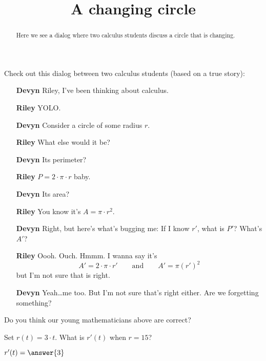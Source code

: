 \documentclass{ximera}
\title[Break-Ground:]{A changing circle}
\begin{document}
\begin{abstract}
Here we see a dialog where two calculus students discuss a circle that
is changing.
\end{abstract}
\maketitle

Check out this dialog between two calculus students (based on a true
story):

\begin{itemize}
  \item[\textbf{Devyn}] Riley, I've been thinking about calculus.   
  \item[\textbf{Riley}] YOLO.
  \item[\textbf{Devyn}] Consider a circle of some radius $r$.
  \item[\textbf{Riley}] What else would it be?
  \item[\textbf{Devyn}] Its perimeter?
  \item[\textbf{Riley}] $P=2\cdot\pi \cdot r$ baby.
  \item[\textbf{Devyn}] Its area?
  \item[\textbf{Riley}] You know it's $A=\pi\cdot r^2$.
  \item[\textbf{Devyn}] Right, but here's what's bugging me: If I know
    $r'$, what is $P'$? What's $A'$?
  \item[\textbf{Riley}] Oooh. Ouch. Hmmm. I wanna say it's
    \[
    A' = 2\cdot\pi \cdot r' \qquad\text{and}\qquad  A' = \pi (r')^2 
    \]
    but I'm not sure that is right.
  \item[\textbf{Devyn}] Yeah\dots me too. But I'm not sure that's
    right either. Are we forgetting something?
\end{itemize}
  
\begin{problem}
  Do you think our young mathematicians above are correct?
  \begin{multipleChoice}
  \end{multipleChoice}
\end{problem}

\begin{problem}
  Set $r(t)=3\cdot t$. What is $r'(t)$ when $r=15$?
  \begin{prompt}
    $r'(t)=\answer{3}$
  \end{prompt}
\end{problem}
\end{document}
